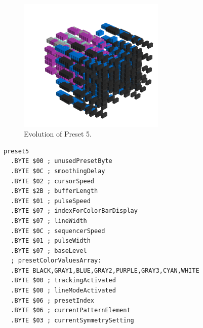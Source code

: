 \clearpage
\begin{minipage}[b]{0.48\linewidth}

\begin{figure}[H]                                                          
  \centering                                                             
  \begin{adjustbox}{width=7cm,center}                                   
  \includegraphics[width=7cm]{src/presets/pattern5-45.png}%
  \end{adjustbox}                                                        
\caption{Evolution of Preset 5.}                                           
\end{figure}                                                               
\end{minipage}
\hspace{0.1cm}
\begin{minipage}[b]{0.48\linewidth}                                       
                                                                           
\begin{lstlisting}[basicstyle=\ttfamily\scriptsize,caption=Data structure for Preset 5.]
preset5
  .BYTE $00 ; unusedPresetByte
  .BYTE $0C ; smoothingDelay
  .BYTE $02 ; cursorSpeed
  .BYTE $2B ; bufferLength
  .BYTE $01 ; pulseSpeed
  .BYTE $07 ; indexForColorBarDisplay
  .BYTE $07 ; lineWidth
  .BYTE $0C ; sequencerSpeed
  .BYTE $01 ; pulseWidth
  .BYTE $07 ; baseLevel
  ; presetColorValuesArray: 
  .BYTE BLACK,GRAY1,BLUE,GRAY2,PURPLE,GRAY3,CYAN,WHITE
  .BYTE $00 ; trackingActivated
  .BYTE $00 ; lineModeActivated
  .BYTE $06 ; presetIndex
  .BYTE $06 ; currentPatternElement
  .BYTE $03 ; currentSymmetrySetting
\end{lstlisting}
\end{minipage}

